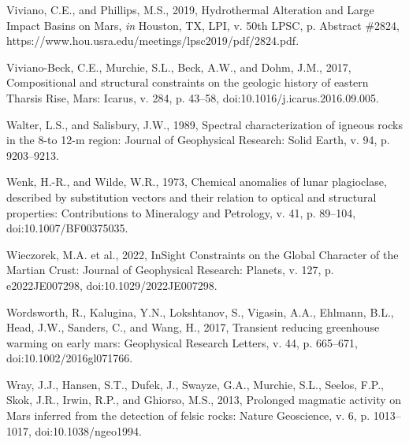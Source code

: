 \documentclass[11pt]{article}
\begin{document}
\begin{thebibliography}{99}
 Viviano, C.E., and Phillips, M.S., 2019, Hydrothermal Alteration and Large Impact Basins on Mars, \textit{in} Houston, TX, LPI, v. 50th LPSC, p. Abstract \#2824, https://www.hou.usra.edu/meetings/lpsc2019/pdf/2824.pdf.

 Viviano-Beck, C.E., Murchie, S.L., Beck, A.W., and Dohm, J.M., 2017, Compositional and structural constraints on the geologic history of eastern Tharsis Rise, Mars: Icarus, v. 284, p. 43--58, doi:10.1016/j.icarus.2016.09.005.

 Walter, L.S., and Salisbury, J.W., 1989, Spectral characterization of igneous rocks in the 8-to 12-\textmu m region: Journal of Geophysical Research: Solid Earth, v. 94, p. 9203--9213.

 Wenk, H.-R., and Wilde, W.R., 1973, Chemical anomalies of lunar plagioclase, described by substitution vectors and their relation to optical and structural properties: Contributions to Mineralogy and Petrology, v. 41, p. 89--104, doi:10.1007/BF00375035.

 Wieczorek, M.A. et al., 2022, InSight Constraints on the Global Character of the Martian Crust: Journal of Geophysical Research: Planets, v. 127, p. e2022JE007298, doi:10.1029/2022JE007298.

 Wordsworth, R., Kalugina, Y.N., Lokshtanov, S., Vigasin, A.A., Ehlmann, B.L., Head, J.W., Sanders, C., and Wang, H., 2017, Transient reducing greenhouse warming on early mars: Geophysical Research Letters, v. 44, p. 665--671, doi:10.1002/2016gl071766.

 Wray, J.J., Hansen, S.T., Dufek, J., Swayze, G.A., Murchie, S.L., Seelos, F.P., Skok, J.R., Irwin, R.P., and Ghiorso, M.S., 2013, Prolonged magmatic activity on Mars inferred from the detection of felsic rocks: Nature Geoscience, v. 6, p. 1013--1017, doi:10.1038/ngeo1994.

\end{thebibliography}
\newpage
\end{document}
